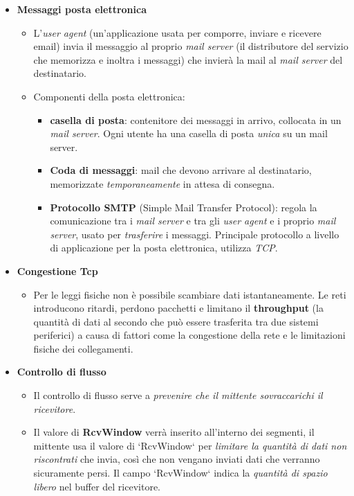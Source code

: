 \begin{itemize}
    \item \textbf{Messaggi posta elettronica}
        \begin{itemize}
            \item L'\textit{user agent} (un'applicazione usata per comporre, inviare e ricevere email) invia il messaggio al proprio \textit{mail server} (il distributore del servizio che memorizza e inoltra i messaggi) che invierà la mail al \textit{mail server} del destinatario.
            \item Componenti della posta elettronica:
                \begin{itemize}
                    \item \textbf{casella di posta}: contenitore dei messaggi in arrivo, collocata in un \textit{mail server}. Ogni utente ha una casella di posta \textit{unica} su un mail server.
                    \item \textbf{Coda di messaggi}: mail che devono arrivare al destinatario, memorizzate \textit{temporaneamente} in attesa di consegna.
                    \item \textbf{Protocollo SMTP} (Simple Mail Transfer Protocol): regola la comunicazione tra i \textit{mail server} e tra gli \textit{user agent} e i proprio \textit{mail server}, usato per \textit{trasferire} i messaggi. Principale protocollo a livello di applicazione per la posta elettronica, utilizza \textit{TCP}.
                \end{itemize}
        \end{itemize}
    \item \textbf{Congestione Tcp}
        \begin{itemize}
            \item Per le leggi fisiche non è possibile scambiare dati istantaneamente. Le reti introducono ritardi, perdono pacchetti e limitano il \textbf{throughput} (la quantità di dati al secondo che può essere trasferita tra due sistemi periferici) a causa di fattori come la congestione della rete e le limitazioni fisiche dei collegamenti.
        \end{itemize}
    \item \textbf{Controllo di flusso}
        \begin{itemize}
            \item Il controllo di flusso serve a \textit{prevenire che il mittente sovraccarichi il ricevitore}.
            \item Il valore di \textbf{RcvWindow} verrà inserito all'interno dei segmenti, il mittente usa il valore di `RcvWindow` per \textit{limitare la quantità di dati non riscontrati} che invia, così che non vengano inviati dati che verranno sicuramente persi. Il campo `RcvWindow` indica la \textit{quantità di spazio libero} nel buffer del ricevitore.

\end{itemize}
\end{itemize}
